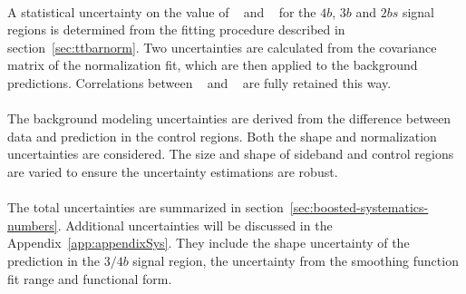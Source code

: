 \paragraph{}
A statistical uncertainty on the value of \muqcd~ and \alphatt~ for the $4b$, $3b$ and $2bs$ signal regions is determined from the fitting procedure described in section~\ref{sec:ttbarnorm}.
Two uncertainties are calculated from the covariance matrix of the normalization fit, which are then applied to the background predictions.
Correlations between \alphatt~ and \muqcd~ are fully retained this way.

\paragraph{}
The background modeling uncertainties are derived from the difference between data and prediction in the control regions. 
Both the shape and normalization uncertainties are considered. 
The size and shape of sideband and control regions are varied to ensure the uncertainty estimations are robust.

\paragraph{}
The total uncertainties are summarized in section~\ref{sec:boosted-systematics-numbers}. 
Additional uncertainties will be discussed in the Appendix~\ref{app:appendixSys}. 
They include the shape uncertainty of the \ttbar~ prediction in the $3/4b$ signal region, the uncertainty from the smoothing function fit range and functional form.

